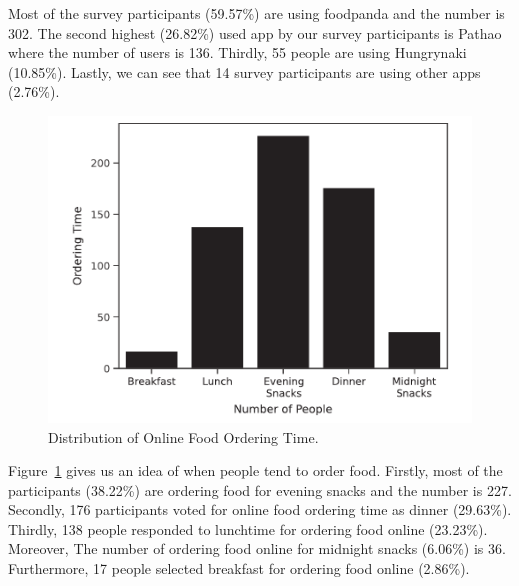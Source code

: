 \documentclass[a4paper,fleqn]{cas-sc}
\begin{document}
Most of the survey participants (59.57\%) are using foodpanda and the number is 302. The second highest (26.82\%) used app by our survey participants is Pathao where the number of users is 136. Thirdly, 55 people are using Hungrynaki (10.85\%). Lastly, we can see that 14 survey participants are using other apps (2.76\%). 


\begin{figure}[htb]
  \centering
  \includegraphics[width = \textwidth]{figs/ordering_time_bar.pdf}
    \caption{Distribution of Online Food Ordering Time.}
    \label{fig:ordering_time}
\end{figure}

Figure~\ref{fig:ordering_time} gives us an idea of when people tend to order food. Firstly, most of the participants (38.22\%) are ordering food for evening snacks and the number is 227. Secondly, 176 participants voted for online food ordering time as dinner (29.63\%). Thirdly, 138 people responded to lunchtime for ordering food online (23.23\%). Moreover, The number of ordering food online for midnight snacks (6.06\%) is 36. Furthermore, 17 people selected breakfast for ordering food online (2.86\%).
\end{document}
